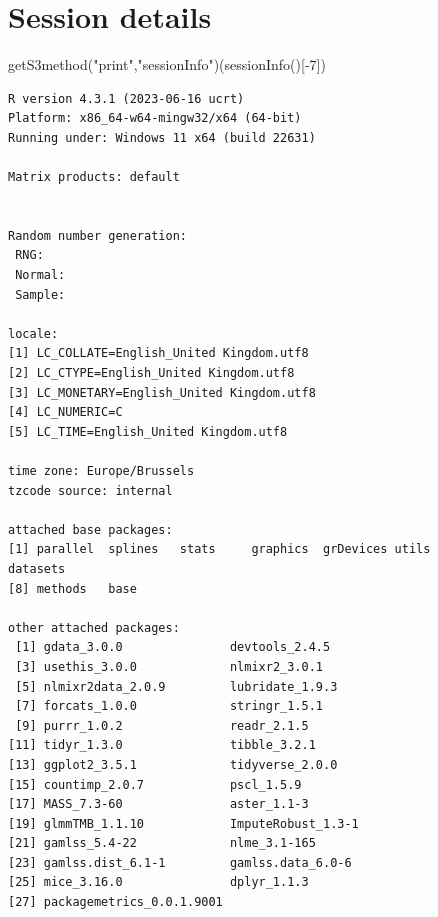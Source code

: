 \documentclass[
]{article}
\newenvironment{Shaded}{}{}
\newcommand{\DecValTok}[1]{\textcolor[rgb]{0.00,0.36,0.77}{#1}}
\newcommand{\FunctionTok}[1]{\textcolor[rgb]{0.44,0.26,0.76}{#1}}
\newcommand{\NormalTok}[1]{\textcolor[rgb]{0.14,0.16,0.18}{#1}}
\newcommand{\SpecialCharTok}[1]{\textcolor[rgb]{0.00,0.36,0.77}{#1}}
\newcommand{\StringTok}[1]{\textcolor[rgb]{0.01,0.18,0.38}{#1}}
\begin{document}
\section{Session details}\label{session-details}

\begin{Shaded}
\begin{Highlighting}[]
\FunctionTok{getS3method}\NormalTok{(}\StringTok{"print"}\NormalTok{,}\StringTok{"sessionInfo"}\NormalTok{)(}\FunctionTok{sessionInfo}\NormalTok{()[}\SpecialCharTok{{-}}\DecValTok{7}\NormalTok{])}
\end{Highlighting}
\end{Shaded}

\begin{verbatim}
R version 4.3.1 (2023-06-16 ucrt)
Platform: x86_64-w64-mingw32/x64 (64-bit)
Running under: Windows 11 x64 (build 22631)

Matrix products: default


Random number generation:
 RNG:     
 Normal:  
 Sample:  
 
locale:
[1] LC_COLLATE=English_United Kingdom.utf8 
[2] LC_CTYPE=English_United Kingdom.utf8   
[3] LC_MONETARY=English_United Kingdom.utf8
[4] LC_NUMERIC=C                           
[5] LC_TIME=English_United Kingdom.utf8    

time zone: Europe/Brussels
tzcode source: internal

attached base packages:
[1] parallel  splines   stats     graphics  grDevices utils     datasets 
[8] methods   base     

other attached packages:
 [1] gdata_3.0.0               devtools_2.4.5           
 [3] usethis_3.0.0             nlmixr2_3.0.1            
 [5] nlmixr2data_2.0.9         lubridate_1.9.3          
 [7] forcats_1.0.0             stringr_1.5.1            
 [9] purrr_1.0.2               readr_2.1.5              
[11] tidyr_1.3.0               tibble_3.2.1             
[13] ggplot2_3.5.1             tidyverse_2.0.0          
[15] countimp_2.0.7            pscl_1.5.9               
[17] MASS_7.3-60               aster_1.1-3              
[19] glmmTMB_1.1.10            ImputeRobust_1.3-1       
[21] gamlss_5.4-22             nlme_3.1-165             
[23] gamlss.dist_6.1-1         gamlss.data_6.0-6        
[25] mice_3.16.0               dplyr_1.1.3              
[27] packagemetrics_0.0.1.9001


\end{verbatim}
\end{document}

